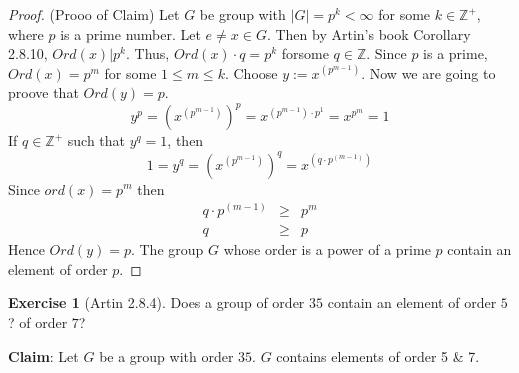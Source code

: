 \documentclass[
]{book}
\theoremstyle{definition}
\theoremstyle{definition}
\theoremstyle{definition}
\newtheorem{exercise}{Exercise}[chapter]
\theoremstyle{definition}
\theoremstyle{remark}
\begin{document}
\begin{proof}
(Prooo of Claim)
Let \(G\) be group with \(|G|=p^k<\infty\) for some \(k\in \mathbb{Z}^+\), where \(p\) is a prime number.
Let \(e\neq x \in G\). Then by Artin's book Corollary 2.8.10,
\(Ord(x)|p^k\). Thus, \(Ord(x)\cdot q=p^k\) forsome \(q\in \mathbb{Z}\).
Since \(p\) is a prime, \(Ord(x)=p^m\) for some \(1\leq m\leq k\).
Choose \(y:=x^{(p^{m-1})}\). Now we are going to proove that \(Ord(y)=p\).
\[y^p=\left(x^{(p^{m-1})}\right)^p=x^{(p^{m-1})\cdot p^1}=x^{p^m}=1\]
If \(q\in \mathbb{Z}^+\) such that \(y^q=1\), then
\[1=y^q=\left(x^{(p^{m-1})}\right)^q=x^{(q \cdot p^{(m-1)})}\]
Since \(ord(x)=p^m\) then
\begin{eqnarray*}
    q\cdot p^{(m-1)}&\geq & p^m  \\
    q &\geq & p
\end{eqnarray*}
Hence \(Ord(y)=p\). The group \(G\) whose order is a power of a prime \(p\) contain an element of order \(p\).
\end{proof}

\begin{exercise}[Artin 2.8.4]
\protect\hypertarget{exr:unnamed-chunk-183}{}\label{exr:unnamed-chunk-183}Does a group of order \(35\) contain an element of order \(5\)? of order \(7\)?
\end{exercise}

\textbf{Claim}: Let \(G\) be a group with order \(35\). \(G\) contains elements of order 5 \& 7.
\end{document}
